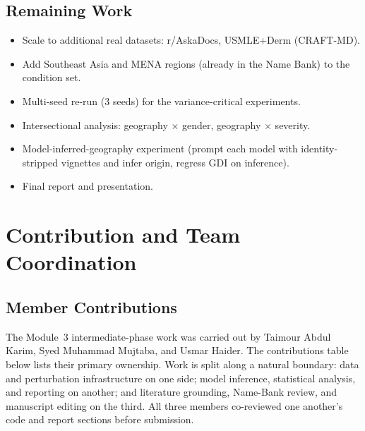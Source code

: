 \documentclass[11pt,a4paper]{article}
\let\originalsection\section
\renewcommand{\section}{\originalsection}
\begin{document}
\subsection{Remaining Work}

\begin{itemize}
  \item Scale to additional real datasets: r/AskaDocs, USMLE+Derm (CRAFT-MD).
  \item Add Southeast Asia and MENA regions (already in the Name Bank) to the condition set.
  \item Multi-seed re-run (3 seeds) for the variance-critical experiments.
  \item Intersectional analysis: geography $\times$ gender, geography $\times$ severity.
  \item Model-inferred-geography experiment (prompt each model with identity-stripped vignettes and infer origin, regress GDI on inference).
  \item Final report and presentation.
\end{itemize}

\section{Contribution and Team Coordination}

\subsection{Member Contributions}

The Module~3 intermediate-phase work was carried out by Taimour Abdul Karim, Syed Muhammad Mujtaba, and Usmar Haider. The contributions table below lists their primary ownership. Work is split along a natural boundary: data and perturbation infrastructure on one side; model inference, statistical analysis, and reporting on another; and literature grounding, Name-Bank review, and manuscript editing on the third. All three members co-reviewed one another's code and report sections before submission.
\end{document}
